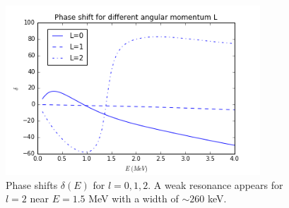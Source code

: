 \documentclass[]{scrartcl}
\begin{document}
\begin{figure}
\centering
	\includegraphics[width=0.85\textwidth]{figures/phase.png}
	\caption{Phase shifts $\delta(E)$ for $l=0,1,2$. A weak resonance appears for $l=2$ near $E=1.5$ MeV with a width of $\sim 260$ keV.}
	\label{fig:phase}
\end{figure}

\clearpage




\end{document}
